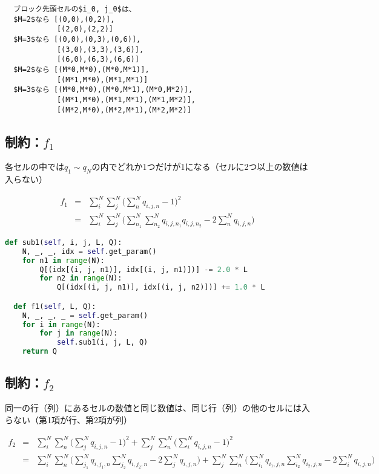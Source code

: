 \documentclass[uplatex,dvipdfmx,a4paper,11pt,oneside,openany]{jsbook}
\begin{document}
\begin{verbatim}
  ブロック先頭セルの$i_0, j_0$は、
  $M=2$なら [(0,0),(0,2)],
            [(2,0),(2,2)]
  $M=3$なら [(0,0),(0,3),(0,6)],
            [(3,0),(3,3),(3,6)],
            [(6,0),(6,3),(6,6)]
  $M=2$なら [(M*0,M*0),(M*0,M*1)],
            [(M*1,M*0),(M*1,M*1)]
  $M=3$なら [(M*0,M*0),(M*0,M*1),(M*0,M*2)],
            [(M*1,M*0),(M*1,M*1),(M*1,M*2)],
            [(M*2,M*0),(M*2,M*1),(M*2,M*2)]
\end{verbatim}

\subsection{制約：$f_1$}

各セルの中では$q_1\sim q_N$の内でどれか1つだけが1になる（セルに2つ以上の数値は入らない）

\begin{eqnarray*}
  f_1 &=& \sum_i^N\sum_j^N\bigg(\sum_n^N q_{i,j,n} - 1\bigg)^2\\
  &=& \sum_i^N\sum_j^N\bigg(\sum_{n_1}^N\sum_{n_2}^N q_{i,j,n_1}q_{i,j,n_2} -2\sum_n^N q_{i,j,n} \bigg)
\end{eqnarray*}

\begin{lstlisting}[language=Python]
  def sub1(self, i, j, L, Q):
    N, _, _, idx = self.get_param()
    for n1 in range(N):
        Q[(idx[(i, j, n1)], idx[(i, j, n1)])] -= 2.0 * L
        for n2 in range(N):
            Q[(idx[(i, j, n1)], idx[(i, j, n2)])] += 1.0 * L

  def f1(self, L, Q):
    N, _, _, _ = self.get_param()
    for i in range(N):
        for j in range(N):
            self.sub1(i, j, L, Q)
    return Q
\end{lstlisting}

\subsection{制約：$f_2$}

同一の行（列）にあるセルの数値と同じ数値は、同じ行（列）の他のセルには入らない（第1項が行、第2項が列）

\begin{eqnarray*}
  f_2 &=& \sum_i^N\sum_n^N\bigg(\sum_j^N q_{i,j,n} - 1\bigg)^2 + \sum_j^N\sum_n^N\bigg(\sum_i^N q_{i,j,n} - 1\bigg)^2\\
  &=& \sum_i^N\sum_n^N\bigg(\sum_{j_1}^Nq_{i,j_1,n}\sum_{j_2}^Nq_{i,j_2,n} - 2\sum_j^N q_{i,j,n}\bigg)
  + \sum_j^N\sum_n^N\bigg(\sum_{i_1}^Nq_{i_1,j,n}\sum_{i_2}^Nq_{i_2,j,n} - 2\sum_i^N q_{i,j,n}\bigg)
\end{eqnarray*}
\end{document}
